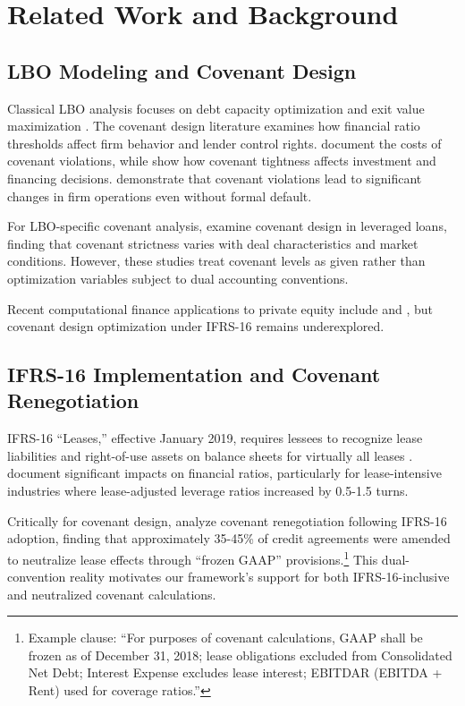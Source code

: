 \documentclass[11pt,a4paper]{article}
\begin{document}
\section{Related Work and Background}

\subsection{LBO Modeling and Covenant Design}

Classical LBO analysis focuses on debt capacity optimization and exit value maximization \citep{kaplan1989effects}. The covenant design literature examines how financial ratio thresholds affect firm behavior and lender control rights. \citet{dichev2002quality} document the costs of covenant violations, while \citet{chava2008default} show how covenant tightness affects investment and financing decisions. \citet{nini2009creditor} demonstrate that covenant violations lead to significant changes in firm operations even without formal default.

For LBO-specific covenant analysis, \citet{demiroglu2010lbo} examine covenant design in leveraged loans, finding that covenant strictness varies with deal characteristics and market conditions. However, these studies treat covenant levels as given rather than optimization variables subject to dual accounting conventions.

Recent computational finance applications to private equity include \citet{buchner2017simulation} and \citet{ang2018alternative}, but covenant design optimization under IFRS-16 remains underexplored.

\subsection{IFRS-16 Implementation and Covenant Renegotiation}

IFRS-16 ``Leases,'' effective January 2019, requires lessees to recognize lease liabilities and right-of-use assets on balance sheets for virtually all leases \citep{ifrs2016leases}. \citet{fito2022ifrs16} document significant impacts on financial ratios, particularly for lease-intensive industries where lease-adjusted leverage ratios increased by 0.5-1.5 turns.

Critically for covenant design, \citet{grossmann2021ifrs16} analyze covenant renegotiation following IFRS-16 adoption, finding that approximately 35-45\% of credit agreements were amended to neutralize lease effects through ``frozen GAAP'' provisions.\footnote{Example clause: ``For purposes of covenant calculations, GAAP shall be frozen as of December 31, 2018; lease obligations excluded from Consolidated Net Debt; Interest Expense excludes lease interest; EBITDAR (EBITDA + Rent) used for coverage ratios.''} This dual-convention reality motivates our framework's support for both IFRS-16-inclusive and neutralized covenant calculations.
\end{document}
